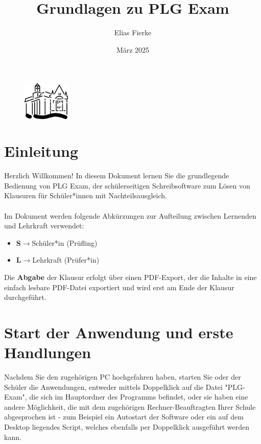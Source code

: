 \documentclass[]{article}
\title{Grundlagen zu PLG Exam}
\date{März 2025}
\author{Elias Fierke}
\begin{document}
	\ohead{}
	\begin{figure}
	\centering
		\includegraphics[width=0.2\textwidth]{plgicon.png}
	\label{fig:logo}
	\end{figure}
	\maketitle
	\tableofcontents
	\newpage
	\section{Einleitung}
	Herzlich Willkommen! In diesem Dokument lernen Sie die grundlegende Bedienung von PLG Exam, der schülerseitigen Schreibsoftware zum Lösen von Klausuren für Schüler*innen mit Nachteilsausgleich.\\\\
    Im Dokument werden folgende Abkürzungen zur Aufteilung zwischen Lernenden und Lehrkraft verwendet:
    \begin{itemize}
    	\item \textbf{S}\hspace*{15pt}$\rightarrow$\hspace*{15pt}Schüler*in (Prüfling)
    	\item \textbf{L}\hspace*{15pt}$\rightarrow$\hspace*{15pt}Lehrkraft (Prüfer*in)
    \end{itemize}
    
    Die \textbf{Abgabe} der Klausur erfolgt über einen PDF-Export, der die Inhalte in eine einfach lesbare PDF-Datei exportiert und wird erst am Ende der Klausur durchgeführt.
	
    \newpage
    \section{Start der Anwendung und erste Handlungen}
    Nachdem Sie den zugehörigen PC hochgefahren haben, starten Sie oder der Schüler die Anwendungen, entweder mittels Doppelklick auf die Datei "PLG-Exam", die sich im Hauptordner des Programms befindet, oder sie haben eine andere Möglichkeit, die mit dem zugehörigen Rechner-Beauftragten Ihrer Schule abgesprochen ist - zum Beispiel ein Autostart der Software oder ein auf dem Desktop liegendes Script, welches ebenfalls per Doppelklick ausgeführt werden kann.\\
\end{document}
